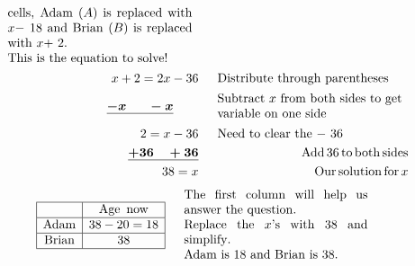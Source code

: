 \begin{example}
\begin{eqnarray*}
\begin{array}{p{0.425\textwidth}}
      \tmop{cells}, \tmop{Adam} ($A$) \tmop{is} \tmop{replaced} \tmop{with} $x -$ 18 \tmop{and} \tmop{Brian} ($B$) \tmop{is} \tmop{replaced} \tmop{with} $x +$ 2.\\ \tmop{This} \tmop{is} \tmop{the} \tmop{equation} \tmop{to} \tmop{solve}!
    \end{array}\\
    x + 2 = 2 x - 36 &  & \begin{array}{p{0.425\textwidth}}
      \tmop{Distribute} \tmop{through} \tmop{parentheses}
    \end{array}\\
    \tmmathbf{\underline{- x ~~~~~- x}}~~~~~~ &  & \begin{array}{p{0.425\textwidth}}
      \tmop{Subtract} $x$ \tmop{from} \tmop{both} \tmop{sides} \tmop{to}
      \tmop{get} \tmop{variable} \tmop{on} \tmop{one} \tmop{side}
    \end{array}\\
    2 = x - 36 &  & \begin{array}{p{0.425\textwidth}}
      \tmop{Need} \tmop{to} \tmop{clear} \tmop{the} $-$ 36
    \end{array}\\
    \tmmathbf{\underline{+ 36 ~~~+ 36}} &  & \tmop{~Add} 36 \tmop{to} \tmop{both}
    \tmop{sides}\\
    38 = x &  & \tmop{~Our} \tmop{solution} \tmop{for} x%
  \end{eqnarray*}
  \begin{eqnarray*}
    \begin{array}{|c|c|}
      \hline
      & \tmop{Age~} \tmop{now}\\
      \hline
      \tmop{Adam} & 38 - 20 = 18\\
      \hline
      \tmop{Brian} & 38\\
      \hline
    \end{array} &  & \begin{array}{p{0.425\textwidth}}
      \tmop{The} \tmop{first} \tmop{column} \tmop{will} \tmop{help} \tmop{us}
      \tmop{answer} \tmop{the} \tmop{question}.\\
      \tmop{Replace} \tmop{the} $x$'s \tmop{with} 38 \tmop{and} \tmop{simplify}.\\
      \tmop{Adam} \tmop{is} 18 \tmop{and} \tmop{Brian} \tmop{is} 38.
    \end{array}
  \end{eqnarray*}
\end{example}


